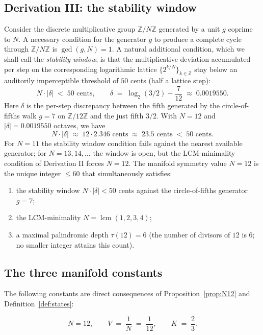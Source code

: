 \documentclass[11pt,a4paper]{article}
\theoremstyle{definition}
\theoremstyle{remark}
\newcommand{\Z}{\mathbb{Z}}
\DeclareMathOperator{\lcm}{lcm}
\begin{document}
\subsection{Derivation III: the stability window}

Consider the discrete multiplicative group $\Z/N\Z$ generated by a unit $g$ coprime to $N$. A necessary condition for the generator $g$ to produce a complete cycle through $\Z/N\Z$ is $\gcd(g,N)=1$. A natural additional condition, which we shall call the \emph{stability window}, is that the multiplicative deviation accumulated per step on the corresponding logarithmic lattice $\{2^{k/N}\}_{k\in\Z}$ stay below an auditorily imperceptible threshold of $50$ cents (half a lattice step):
\[
N\cdot|\delta| \;<\; 50 \text{ cents}, \qquad \delta \;=\; \log_{2}(3/2) - \frac{7}{12} \;\approx\; 0.0019550.
\]
Here $\delta$ is the per-step discrepancy between the fifth generated by the circle-of-fifths walk $g=7$ on $\Z/12\Z$ and the just fifth $3/2$. With $N=12$ and $|\delta| = 0.0019550$ octaves, we have
\[
N\cdot|\delta| \;\approx\; 12\cdot 2.346\text{ cents} \;\approx\; 23.5 \text{ cents} \;<\; 50 \text{ cents}.
\]
For $N=11$ the stability window condition fails against the nearest available generator; for $N=13,14,\ldots$ the window is open, but the LCM-minimality condition of Derivation II forces $N=12$. The manifold symmetry value $N=12$ is the unique integer $\le 60$ that simultaneously satisfies:
\begin{enumerate}[leftmargin=*,label=(\roman*)]
\item the stability window $N\cdot|\delta|<50$ cents against the circle-of-fifths generator $g=7$;
\item the LCM-minimality $N=\lcm(1,2,3,4)$;
\item a maximal palindromic depth $\tau(12)=6$ (the number of divisors of $12$ is $6$; no smaller integer attains this count).
\end{enumerate}

\subsection{The three manifold constants}\label{subsec:constants}

The following constants are direct consequences of Proposition~\ref{prop:N12} and Definition~\ref{def:states}:

\begin{equation}\label{eq:constants}
\boxed{\;N = 12, \qquad V \;=\; \frac{1}{N} \;=\; \frac{1}{12}, \qquad K \;=\; \frac{2}{3}.\;}
\end{equation}
\end{document}
